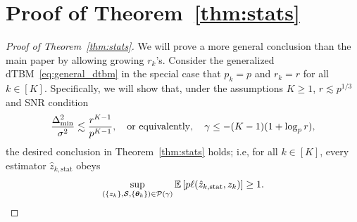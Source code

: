 \documentclass[lettersize,onecolumn,journal]{IEEEtran}
\theoremstyle{definition}
\theoremstyle{definition}
\begin{document}
\section*{Proof of Theorem~\ref{thm:stats}}

\begin{proof}[Proof of Theorem~\ref{thm:stats}]
We will prove a more general conclusion than the main paper by allowing growing $r_k$'s. Consider the generalized dTBM~\eqref{eq:general_dtbm} in the special case that $p_k = p$ and $r_k = r$ for all $ k\in [K]$. Specifically, we will show that, under 
the assumptions $K\geq 1$, $r\lesssim p^{1/3}$ and SNR condition
\[
{\Delta^2_{\min}\over \sigma^2}\lesssim {r^{K-1}\over p^{K-1}},\quad \text{or equivalently}, \quad \gamma\leq -(K-1)(1+\log_p r),
\]
 the desired conclusion in Theorem~\ref{thm:stats} holds; i.e, for all $k \in [K]$, every estimator $\hat z_{k,\text{stat}}$ obeys
\begin{equation}\label{eq:max}
    \sup_{(\{z_k\}, \tS, \{\mtheta_k\}) \in \tP(\gamma)} \bbE \left[ p\ell(\hat z_{k,\text{stat}}, z_k) \right]\geq 1.
\end{equation}


\end{proof}
\end{document}
